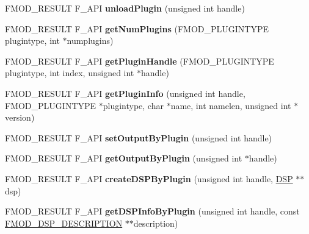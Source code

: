 \begin{DoxyCompactItemize}
F\+M\+O\+D\+\_\+\+R\+E\+S\+U\+LT F\+\_\+\+A\+PI {\bfseries unload\+Plugin} (unsigned int handle)
\item 
\mbox{\label{classFMOD_1_1System_a1a066a03febf0c76a43162e5abc09c7b}} 
F\+M\+O\+D\+\_\+\+R\+E\+S\+U\+LT F\+\_\+\+A\+PI {\bfseries get\+Num\+Plugins} (F\+M\+O\+D\+\_\+\+P\+L\+U\+G\+I\+N\+T\+Y\+PE plugintype, int $\ast$numplugins)
\item 
\mbox{\label{classFMOD_1_1System_aa94d36d0d28721e35ec47fb1ef06ce1f}} 
F\+M\+O\+D\+\_\+\+R\+E\+S\+U\+LT F\+\_\+\+A\+PI {\bfseries get\+Plugin\+Handle} (F\+M\+O\+D\+\_\+\+P\+L\+U\+G\+I\+N\+T\+Y\+PE plugintype, int index, unsigned int $\ast$handle)
\item 
\mbox{\label{classFMOD_1_1System_a68da30ad69d2f9320ddbdc4ced35fec1}} 
F\+M\+O\+D\+\_\+\+R\+E\+S\+U\+LT F\+\_\+\+A\+PI {\bfseries get\+Plugin\+Info} (unsigned int handle, F\+M\+O\+D\+\_\+\+P\+L\+U\+G\+I\+N\+T\+Y\+PE $\ast$plugintype, char $\ast$name, int namelen, unsigned int $\ast$version)
\item 
\mbox{\label{classFMOD_1_1System_a014b2d9623aca816e8054867517067ff}} 
F\+M\+O\+D\+\_\+\+R\+E\+S\+U\+LT F\+\_\+\+A\+PI {\bfseries set\+Output\+By\+Plugin} (unsigned int handle)
\item 
\mbox{\label{classFMOD_1_1System_a4fc02b0d0253fb9c16427393d25bad59}} 
F\+M\+O\+D\+\_\+\+R\+E\+S\+U\+LT F\+\_\+\+A\+PI {\bfseries get\+Output\+By\+Plugin} (unsigned int $\ast$handle)
\item 
\mbox{\label{classFMOD_1_1System_a3b6b43cfc7eced0c0babf56403d91f6f}} 
F\+M\+O\+D\+\_\+\+R\+E\+S\+U\+LT F\+\_\+\+A\+PI {\bfseries create\+D\+S\+P\+By\+Plugin} (unsigned int handle, \hyperlink{classFMOD_1_1DSP}{D\+SP} $\ast$$\ast$dsp)
\item 
\mbox{\label{classFMOD_1_1System_ade2dc1c4b0ce419ade897ad06ee524a4}} 
F\+M\+O\+D\+\_\+\+R\+E\+S\+U\+LT F\+\_\+\+A\+PI {\bfseries get\+D\+S\+P\+Info\+By\+Plugin} (unsigned int handle, const \hyperlink{structFMOD__DSP__DESCRIPTION}{F\+M\+O\+D\+\_\+\+D\+S\+P\+\_\+\+D\+E\+S\+C\+R\+I\+P\+T\+I\+ON} $\ast$$\ast$description)
\item 

\end{DoxyCompactItemize}
